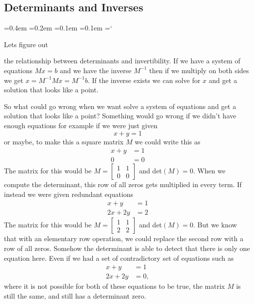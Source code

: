 
\subsection*{Determinants and Inverses}

{\ttfamily
{}\font=0.4em
\font=0.2em
\font=0.1em
\font=0.1em
\hyphenchar\font=`\-


\hypertarget{scripts_elementary_matrices_determinants_ii_inverses}{Lets figure out} the relationship between determinants and invertibility. If we have a system of equations $Mx=b$ and we have the inverse $M^{-1}$ then if we multiply on both sides we get $ x = M^{-1}Mx= M^{-1}b$. If the inverse exists we can solve for $x$ and get a solution that looks like a point. 

So what could go wrong when we want solve a system of equations and get a solution that looks like a point? Something would go wrong if we didn't have enough equations for example if we were just given 
\[
x+y = 1
\]
or maybe, to make this a square matrix $M$ we could write this as 
\begin{align*}
x+y &= 1\\
0 &= 0
\end{align*}
The matrix for this would be 
$M =\begin{bmatrix}
1 & 1\\
0& 0 
\end{bmatrix}$ 
and det$(M) = 0$. When we compute the determinant, this row of all zeros gets multiplied in every term. If instead we were given redundant equations 
\begin{align*}
x+y &= 1\\
2x+2y &= 2
\end{align*}
The matrix for this would be 
$M =\begin{bmatrix}
1 & 1\\
2& 2 
\end{bmatrix}$  and det$(M) = 0$. But we know that with an elementary row operation, we could replace the second row with a row of all zeros. Somehow the determinant is able to detect that there is only one equation here. Even if we had a set of contradictory set of equations such as
\begin{align*}
x+y &= 1\\
2x+2y &= 0,
\end{align*}
where it is not possible for both of these equations to be true, the matrix $M$ is still the same, and still has a determinant zero.

}
